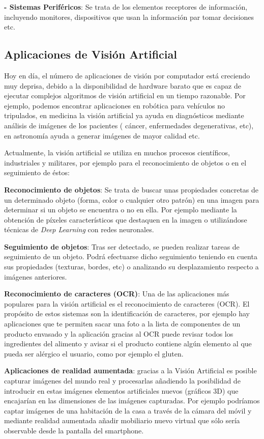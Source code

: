 	\textbf{- Sistemas Periféricos}: Se trata de los elementos receptores de información, incluyendo monitores, dispositivos que usan la información par tomar decisiones etc.

\subsection{Aplicaciones de Visión Artificial}
Hoy en día, el número de aplicaciones de visión por computador está creciendo muy deprisa, debido a la disponibilidad de hardware barato que es capaz de ejecutar complejos algoritmos de visión artificial en un tiempo razonable. Por ejemplo, podemos encontrar aplicaciones en robótica para vehículos no tripulados, en medicina la visión artificial ya ayuda en diagnósticos mediante análisis de imágenes de los pacientes ( cáncer, enfermedades degenerativas, etc), en astronomía ayuda a generar imágenes de mayor calidad etc.

Actualmente, la visión artificial se utiliza en muchos procesos científicos, industriales y militares, por ejemplo para el reconocimiento de objetos o en el seguimiento de éstos:

	\textbf{Reconocimiento de objetos}: Se trata de buscar unas propiedades concretas de un determinado objeto (forma, color o cualquier otro patrón) en una imagen para determinar si un objeto se encuentra o no en ella. Por ejemplo mediante la obtención de píxeles característicos que destaquen en la imagen o utilizándose técnicas de \textit{Deep Learning} con redes neuronales.

	\textbf{Seguimiento de objetos}: Tras ser detectado, se pueden realizar tareas de seguimiento de un objeto. Podrá efectuarse dicho seguimiento teniendo en cuenta sus propiedades (texturas, bordes, etc) o analizando su desplazamiento respecto a imágenes anteriores.

	\textbf{Reconocimiento de caracteres (OCR)}:  Una de las aplicaciones más populares para la visión artificial es el reconocimiento de caracteres (OCR). El propósito de estos sistemas son la identificación de caracteres, por ejemplo hay aplicaciones que te permiten sacar una foto a la lista de componentes de un producto envasado y la aplicación gracias al OCR puede revisar todos los ingredientes del alimento y avisar si el producto contiene algún elemento al que pueda ser alérgico el usuario, como por ejemplo el gluten.

	\textbf{Aplicaciones de realidad aumentada}: gracias a la Visión Artificial es posible capturar imágenes del mundo real y procesarlas añadiendo la posibilidad de introducir en estas imágenes elementos artificiales nuevos (gráficos 3D) que encajarían en las dimensiones de las imágenes capturadas. Por ejemplo podríamos captar imágenes de una habitación de la casa a través de la cámara del móvil y mediante realidad aumentada añadir mobiliario nuevo virtual que sólo sería observable desde la pantalla del smartphone.

